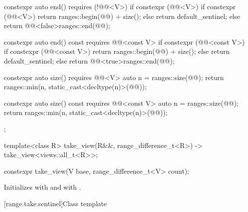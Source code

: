 \begin{codeblock}
{{    constexpr auto end() requires (!@@<V>) {
      if constexpr (@@<V>) {
        if constexpr (@@<V>)
          return ranges::begin(@@) + size();
        else
          return default_sentinel;
      } else
        return @@<false>{ranges::end(@@)};
    }

    constexpr auto end() const requires @@<const V> {
      if constexpr (@@<const V>) {
        if constexpr (@@<const V>)
          return ranges::begin(@@) + size();
        else
          return default_sentinel;
      } else
        return @@<true>{ranges::end(@@)};
    }

    constexpr auto size() requires @@<V> {
      auto n = ranges::size(@@);
      return ranges::min(n, static_cast<decltype(n)>(@@));
    }

    constexpr auto size() const requires @@<const V> {
      auto n = ranges::size(@@);
      return ranges::min(n, static_cast<decltype(n)>(@@));
    }
  };

  template<class R>
    take_view(R&&, range_difference_t<R>)
      -> take_view<views::all_t<R>>;
}
\end{codeblock}

%
\begin{itemdecl}
constexpr take_view(V base, range_difference_t<V> count);
\end{itemdecl}

\begin{itemdescr}
\pnum
\effects
Initializes  with  and
 with .
\end{itemdescr}

[range.take.sentinel]{Class template }

